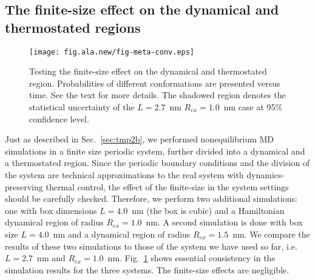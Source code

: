 \documentclass[a4paper,preprint,unsortedaddress,onecolumn]{revtex4-1}
\newcommand{\recheck}[1]{{\color{red} #1}}
\begin{document}
\subsection{The finite-size effect on the dynamical and thermostated regions}

\begin{figure}
  \centering
  \texttt{[image: fig.ala.new/fig-meta-conv.eps]}
  \caption{Testing the finite-size effect on the dynamical and thermostated region.
    Probabilities of different conformations are presented versus time.
    See the text for more details.
    \recheck{The shadowed region denotes the
      statistical uncertainty of the $L=2.7$~nm $R_{ex}=1.0$~nm case at 95\% confidence level.
    }
  }
  \label{fig:tmp7}
\end{figure}

Just as described in Sec.~\ref{sec:tmp2b}, we performed nonequilibrium MD
simulations in a finite size periodic system, further divided 
into a dynamical and a thermostated region.
Since the periodic boundary conditions and the division of the system
are technical approximations to the real system with dynamics-preserving thermal control, 
the effect of the finite-size in 
the system settings should be carefully checked.
Therefore, we
perform two additional simulations: one with box dimensions
$L=4.0$~nm (the box is cubic) and a
Hamiltonian dynamical region of radius $R_{ex} = 1.0$~nm. A second simulation is done with box size $L=4.0$~nm and a dynamical region of
radius $R_{ex} = 1.5$~nm. We compare the results of these two simulations to those of the system we have used so far, i.e. $L=2.7$~nm and $R_{ex} = 1.0$~nm.
Fig.~\ref{fig:tmp7} shows essential consistency in
the simulation results for the three systems. The finite-size effects are
negligible.
\end{document}
